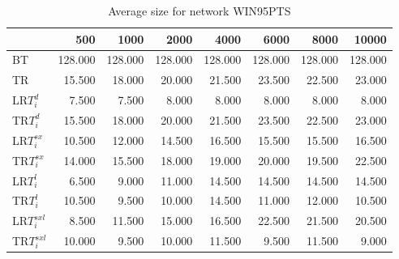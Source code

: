 \begin{table}
\begin{center}
\begin{tabular}{lrrrrrrr}
 & 500 & 1000 & 2000 & 4000 & 6000 & 8000 & 10000\\\hline
BT & 128.000 & 128.000 & 128.000 & 128.000 & 128.000 & 128.000 & 128.000\\\hline
TR & 15.500 & 18.000 & 20.000 & 21.500 & 23.500 & 22.500 & 23.000\\\hline
LR$T_i^d$ & 7.500 & 7.500 & 8.000 & 8.000 & 8.000 & 8.000 & 8.000\\\hline
TR$T_i^d$ & 15.500 & 18.000 & 20.000 & 21.500 & 23.500 & 22.500 & 23.000\\\hline
LR$T_i^{sx}$ & 10.500 & 12.000 & 14.500 & 16.500 & 15.500 & 15.500 & 16.500\\\hline
TR$T_i^{sx}$ & 14.000 & 15.500 & 18.000 & 19.000 & 20.000 & 19.500 & 22.500\\\hline
LR$T_i^l$ & 6.500 & 9.000 & 11.000 & 14.500 & 14.500 & 14.500 & 14.500\\\hline
TR$T_i^l$ & 10.500 & 9.500 & 10.000 & 14.500 & 11.000 & 12.000 & 10.500\\\hline
LR$T_i^{sxl}$ & 8.500 & 11.500 & 15.000 & 16.500 & 22.500 & 21.500 & 20.500\\\hline
TR$T_i^{sxl}$ & 10.000 & 9.500 & 10.000 & 11.500 & 9.500 & 11.500 & 9.000\\\hline
\end{tabular}
\end{center}
\caption{Average size for network WIN95PTS }
\label{Win95ptssi}
\end{table}

